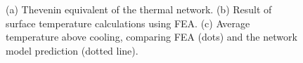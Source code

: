 \begin{figure}[ht]
\centering
{}\quad\quad
{}\quad\quad
{}
\caption{(a) Thevenin equivalent of the thermal network. (b) Result of surface temperature calculations using FEA. (c) Average temperature above cooling, comparing FEA (dots) and the network model prediction (dotted line).}
\label{fig:verification}
\end{figure}
